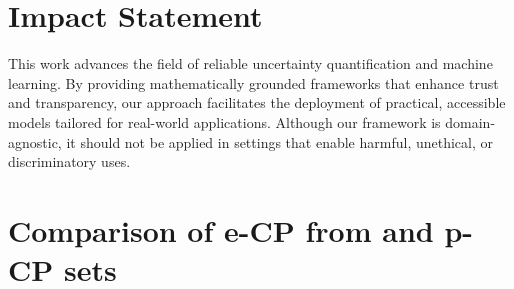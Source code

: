 \documentclass{article}
\theoremstyle{plain}
\theoremstyle{definition}
\theoremstyle{remark}
\begin{document}




\section*{Impact Statement}

This work advances the field of reliable uncertainty quantification and machine learning. By providing mathematically grounded frameworks that enhance trust and transparency, our approach facilitates the deployment of practical, accessible models tailored for real-world applications.
Although our framework is domain-agnostic, it should not be applied in settings that enable harmful, unethical, or discriminatory uses.





\newpage
\appendix
\onecolumn


\section{Comparison of e-CP from \citep{balinsky2024} and p-CP sets}
\label{app:e-variable_balinsky comparaison}
\end{document}
